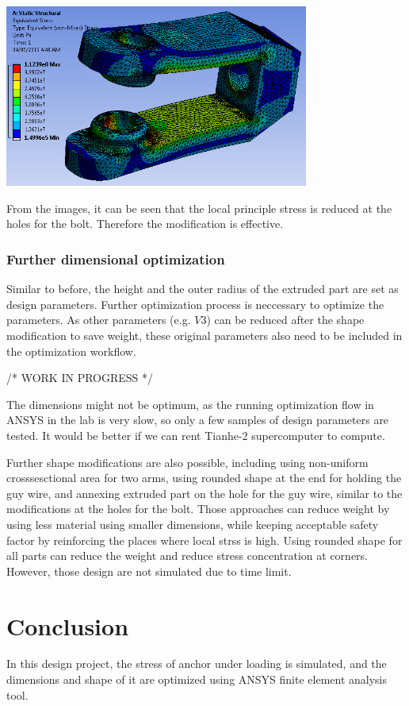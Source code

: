\documentclass[a4paper,14pt]{extarticle}
\begin{document}
\begin{center}\includegraphics[width=0.75\textwidth]{NX/STRESS2.PNG}\end{center}

From the images, it can be seen that the local principle stress is reduced at the holes for the bolt. Therefore the modification is effective.
\subsubsection{Further dimensional optimization}
Similar to before, the height and the outer radius of the extruded part are set as design parameters. Further optimization process is neccessary to optimize the parameters. As other parameters (e.g. $V3$) can be reduced after the shape modification to save weight, these original parameters also need to be included in the optimization workflow.

/* WORK IN PROGRESS */

The dimensions might not be optimum, as the running optimization flow in ANSYS in the lab is very slow, so only a few samples of design parameters are tested. It would be better if we can rent Tianhe-2 supercomputer to compute.

Further shape modifications are also possible, including using non-uniform crosssesctional area for two arms, using rounded shape at the end for holding the guy wire, and annexing extruded part on the hole for the guy wire, similar to the modifications at the holes for the bolt. Those approaches can reduce weight by using less material using smaller dimensions, while keeping acceptable safety factor by reinforcing the places where local strss is high. Using rounded shape for all parts can reduce the weight and reduce stress concentration at corners. However, those design are not simulated due to time limit. 
\section{Conclusion}
In this design project, the stress of anchor under loading is simulated, and the dimensions and shape of it are optimized using ANSYS finite element analysis tool.
\end{document}
